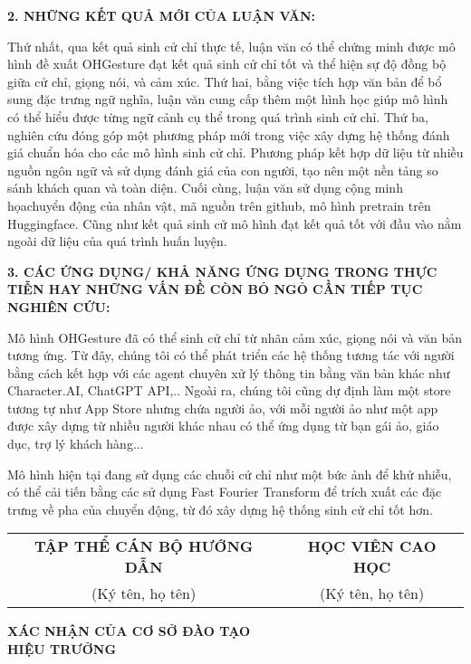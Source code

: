 \vspace{5pt}
{\MakeUppercase \Large \bfseries 2. NHỮNG KẾT QUẢ MỚI CỦA LUẬN VĂN:}


Thứ nhất, qua kết quả sinh cử chỉ thực tế, luận văn có thể chứng minh được mô hình đề xuất OHGesture đạt kết quả sinh cử chỉ tốt và thể hiện sự độ đồng bộ giữa cử chỉ, giọng nói, và cảm xúc.
Thứ hai, bằng việc tích hợp văn bản để bổ sung đặc trưng ngữ nghĩa, luận văn cung cấp thêm một hình học giúp mô hình có thể hiểu được từng ngữ cảnh cụ thể trong quá trình sinh cử chỉ.
Thứ ba, nghiên cứu đóng góp một phương pháp mới trong việc xây dựng hệ thống đánh giá chuẩn hóa cho các mô hình sinh cử chỉ. Phương pháp kết hợp dữ liệu từ nhiều nguồn ngôn ngữ và sử dụng đánh giá của con người, tạo nên một nền tảng so sánh khách quan và toàn diện.
Cuối cùng, luận văn sử dụng cộng minh họachuyển động của nhân vật, mã nguồn trên github, mô hình pretrain trên Huggingface. Cũng như kết quả sinh cử mô hình đạt kết quả tốt với đầu vào nằm ngoài dữ liệu của quá trình huấn luyện.

\vspace{5pt}
{\MakeUppercase \Large \bfseries 3. CÁC ỨNG DỤNG/ KHẢ NĂNG ỨNG DỤNG TRONG THỰC TIỄN HAY NHỮNG VẤN ĐỀ CÒN BỎ NGỎ CẦN TIẾP TỤC NGHIÊN CỨU:}


Mô hình OHGesture đã có thể sinh cử chỉ từ nhãn cảm xúc, giọng nói và văn bản tương ứng.
Từ đây, chúng tôi có thể phát triển các hệ thống tương tác với người bằng cách kết hợp với các agent chuyên xử lý thông tin bằng văn bản khác như Character.AI, ChatGPT API,.. Ngoài ra, chúng tôi cũng dự định làm một store tương tự như App Store nhưng chứa người ảo, với mỗi người ảo như một app được xây dựng từ nhiều người khác nhau có thể ứng dụng từ bạn gái ảo, giáo dục, trợ lý khách hàng...

Mô hình hiện tại đang sử dụng các chuỗi cử chỉ như một bức ảnh để khử nhiễu, có thể cải tiến bằng các sử dụng Fast Fourier Transform để trích xuất các đặc trưng về pha của chuyển động, từ đó xây dựng hệ thống sinh cử chỉ tốt hơn.


\begin{center}
    \begin{tabular}{c c}
        \textbf{TẬP THỂ CÁN BỘ HƯỚNG DẪN} & \textbf{HỌC VIÊN CAO HỌC} \\
        (Ký tên, họ tên) & (Ký tên, họ tên) \\
    \end{tabular}
    
    \vspace{3cm} %
    
    \textbf{XÁC NHẬN CỦA CƠ SỞ ĐÀO TẠO} \\
    \textbf{HIỆU TRƯỞNG}
\end{center}

